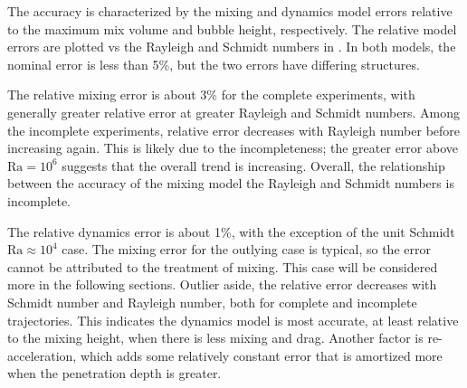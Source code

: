 The accuracy is characterized by the mixing and dynamics model errors relative to the maximum mix volume and bubble height, respectively.
The relative model errors are plotted vs the Rayleigh and Schmidt numbers in .
In both models, the nominal error is less than 5\%, but the two errors have differing structures.

The relative mixing error is about 3\% for the complete experiments, with generally greater relative error at greater Rayleigh and Schmidt numbers.
Among the incomplete experiments, relative error decreases with Rayleigh number before increasing again.
This is likely due to the incompleteness; the greater error above $\text{Ra} = 10^6$ suggests that the overall trend is increasing.
Overall, the relationship between the accuracy of the mixing model the Rayleigh and Schmidt numbers is incomplete.

The relative dynamics error is about 1\%, with the exception of the unit Schmidt $\text{Ra} \approx 10^4$ case.
The mixing error for the outlying case is typical, so the error cannot be attributed to the treatment of mixing.
This case will be considered more in the following sections.
Outlier aside, the relative error decreases with Schmidt number and Rayleigh number, both for complete and incomplete trajectories.
This indicates the dynamics model is most accurate, at least relative to the mixing height, when there is less mixing and drag.
Another factor is re-acceleration, which adds some relatively constant error that is amortized more when the penetration depth is greater.

